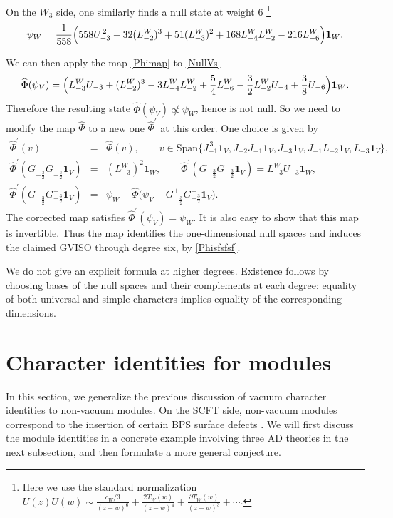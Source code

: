 \documentclass[a4paper,11pt]{article}
\theoremstyle{definition}
\theoremstyle{definition}
\theoremstyle{remark}
\newcommand{\be}{\begin{equation}}
\newcommand{\ee}{\end{equation}}
\newcommand{\beqn}{\begin{eqnarray}}
\newcommand{\eeqn}{\end{eqnarray}}
\begin{document}
On the $W_3 $ side,  one   similarly finds a null state at weight 6
\footnote{Here we use the standard normalization $U(z)U(w)\sim\frac{c_W/3}{(z-w)^6}
+\frac{2T_W(w)}{(z-w)^4}
+\frac{\partial T_W(w)}{(z-w)^3} +\cdots$.}
\be 
\psi_W=\frac{1}{558} 
\Bigl(
558U_{-3}^{\,2}
-32(L^W_{-2})^3
+51(L^W_{-3})^2
+168L^W_{-4}L^W_{-2}
-216L^W_{-6}
\Bigr)\mathbf1_W.
 \ee


 

 
We can then apply the map \eqref{Phimap} to  \eqref{NullVs} 
\be 
\widehat\Phi(\psi_V)=\Bigl(
 L^W_{-3}U_{-3}
+(L^W_{-2})^3
-3L^W_{-4}L^W_{-2}
+\frac{5}{4}L^W_{-6} 
-\frac{3}{2}L^W_{-2}U_{-4}
+\frac{3}{8}U_{-6}
\Bigr)\mathbf1_W .
\ee
Therefore the resulting state $\widehat \Phi (\psi_V) \not \propto \psi_W$, hence is not null. 
So we need to modify the map $\widehat \Phi $ to a new one $\widehat \Phi ^\prime$ at this order. One choice is given by  
\beqn
\widehat \Phi ^\prime(v) &=&\widehat \Phi (v) , \qquad v\in \text{Span} \Big\{J_{-1}^{\,3} \mathbf{1}_V,   J_{-2}J_{-1} \mathbf{1}_V,   J_{-3} \mathbf{1}_V,   J_{-1}L_{-2} \mathbf{1}_V,   L_{-3} \mathbf{1}_V \Big\},\qquad\qquad\quad
\\
\widehat \Phi ^\prime( G^+_{-\frac32}G^+_{-\frac32}\mathbf1_V) &=&(L_{-3}^W)^2 \mathbf1_W,\qquad
\widehat \Phi ^\prime( G^-_{-\frac32}G^-_{-\frac32}\mathbf1_V) =L_{-3}^W U_{-3}  \mathbf1_W,
\\
\widehat \Phi ^\prime( G^+_{-\frac32}G^-_{-\frac32}\mathbf1_V)
&=&\psi_W -\widehat \Phi \Big( \psi_V- G^+_{-\frac32}G^-_{-\frac32}\mathbf1_V \Big) .
\eeqn
The corrected map satisfies $\widehat\Phi^{\prime}(\psi_V)=\psi_W$. It is also easy to show that this map is invertible. Thus the map identifies the one-dimensional null spaces and induces the claimed GVISO through degree six, by \eqref{Phisfsfsf}. 

We do not give an explicit formula at higher degrees. Existence follows by choosing bases of the null spaces and their complements at each degree: equality of both universal and simple characters implies equality of the corresponding dimensions.
   
\section{Character identities for  modules     } \label{charmodules}
 
 In this section, we generalize the previous discussion of vacuum character identities to non-vacuum modules. On the SCFT side, non-vacuum modules correspond to the insertion of certain BPS surface defects \cite{Cordova:2017mhb}. We will first discuss the module identities in a concrete example involving three AD theories in the next subsection, and then formulate a more general conjecture.
  
\end{document}
